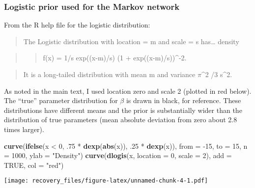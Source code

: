 \documentclass[11pt,]{article}
\newenvironment{Shaded}{\begin{snugshade}}{\end{snugshade}}
\newcommand{\KeywordTok}[1]{\textcolor[rgb]{0.13,0.29,0.53}{\textbf{{#1}}}}
\newcommand{\DataTypeTok}[1]{\textcolor[rgb]{0.13,0.29,0.53}{{#1}}}
\newcommand{\DecValTok}[1]{\textcolor[rgb]{0.00,0.00,0.81}{{#1}}}
\newcommand{\StringTok}[1]{\textcolor[rgb]{0.31,0.60,0.02}{{#1}}}
\newcommand{\OtherTok}[1]{\textcolor[rgb]{0.56,0.35,0.01}{{#1}}}
\newcommand{\NormalTok}[1]{{#1}}
\begin{document}
\subsubsection{Logistic prior used for the Markov
network}\label{logistic-prior-used-for-the-markov-network}

From the R help file for the logistic distribution:

\begin{quote}
The Logistic distribution with location = m and scale = s has\ldots{}
density
\end{quote}

\begin{quote}
\begin{quote}
f(x) = 1/s exp((x-m)/s) (1 + exp((x-m)/s))\^{}-2.
\end{quote}
\end{quote}

\begin{quote}
It is a long-tailed distribution with mean m and variance \(\pi\)\^{}2
/3 s\^{}2.
\end{quote}

As noted in the main text, I used location zero and scale 2 (plotted in
red below). The ``true'' parameter distribution for \(\beta\) is drawn
in black, for reference. These distributions have different means and
the prior is substantially wider than the distribution of true
parameters (mean absolute deviation from zero about 2.8 times larger).

\begin{Shaded}
\begin{Highlighting}[]
\KeywordTok{curve}\NormalTok{(}\KeywordTok{ifelse}\NormalTok{(x <}\StringTok{ }\DecValTok{0}\NormalTok{, .}\DecValTok{75} \NormalTok{*}\StringTok{ }\KeywordTok{dexp}\NormalTok{(}\KeywordTok{abs}\NormalTok{(x)), .}\DecValTok{25} \NormalTok{*}\StringTok{ }\KeywordTok{dexp}\NormalTok{(x)), }\DataTypeTok{from =} \NormalTok{-}\DecValTok{15}\NormalTok{, }\DataTypeTok{to =} \DecValTok{15}\NormalTok{,}
      \DataTypeTok{n =} \DecValTok{1000}\NormalTok{, }\DataTypeTok{ylab =} \StringTok{"Density"}\NormalTok{)}
\KeywordTok{curve}\NormalTok{(}\KeywordTok{dlogis}\NormalTok{(x, }\DataTypeTok{location =} \DecValTok{0}\NormalTok{, }\DataTypeTok{scale =} \DecValTok{2}\NormalTok{), }\DataTypeTok{add =} \OtherTok{TRUE}\NormalTok{, }\DataTypeTok{col =} \StringTok{"red"}\NormalTok{)}
\end{Highlighting}
\end{Shaded}

\texttt{[image: recovery\_files/figure-latex/unnamed-chunk-4-1.pdf]}
\end{document}
